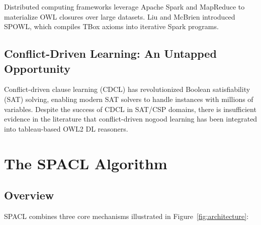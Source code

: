 \documentclass[preprint,12pt]{elsarticle}
\begin{document}
Distributed computing frameworks leverage Apache Spark and MapReduce to materialize OWL closures over large datasets. Liu and McBrien introduced SPOWL, which compiles TBox axioms into iterative Spark programs.

\subsection{Conflict-Driven Learning: An Untapped Opportunity}

Conflict-driven clause learning (CDCL) has revolutionized Boolean satisfiability (SAT) solving, enabling modern SAT solvers to handle instances with millions of variables. Despite the success of CDCL in SAT/CSP domains, there is insufficient evidence in the literature that conflict-driven nogood learning has been integrated into tableau-based OWL2 DL reasoners.

\section{The SPACL Algorithm}
\label{sec:algorithm}

\subsection{Overview}
\label{sec:overview}

SPACL combines three core mechanisms illustrated in Figure~\ref{fig:architecture}:
\end{document}
